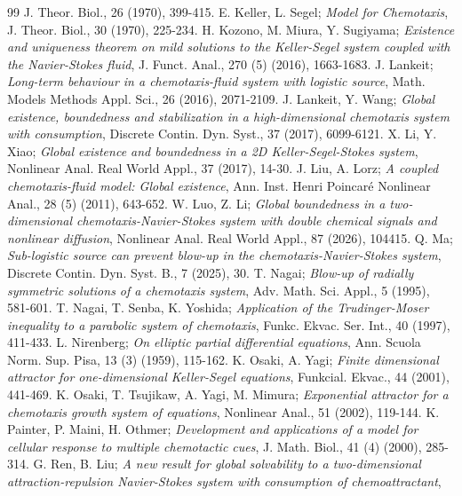\documentclass[10pt,a4paper]{amsart}
\numberwithin{equation}{section}
\begin{document}
\begin{thebibliography}{99}
J. Theor. Biol., 26 (1970), 399-415.
 E. Keller, L. Segel;
\emph{Model for Chemotaxis}, J. Theor. Biol., 30 (1970), 225-234.
 H. Kozono, M. Miura, Y. Sugiyama;
\emph{Existence and uniqueness theorem on mild solutions to the Keller-Segel 
system coupled with the Navier-Stokes fluid}, 
J. Funct. Anal., 270 (5) (2016), 1663-1683.
 J. Lankeit;
\emph{Long-term behaviour in a chemotaxis-fluid system with logistic source}, 
Math. Models Methods Appl. Sci., 26 (2016), 2071-2109.
 J. Lankeit, Y. Wang;
\emph{Global existence, boundedness and stabilization in a high-dimensional 
chemotaxis system with consumption}, Discrete Contin. Dyn. Syst., 37 (2017), 6099-6121.
 X. Li, Y. Xiao;
\emph{Global existence and boundedness in a 2D Keller-Segel-Stokes system}, 
Nonlinear Anal. Real World Appl., 37 (2017), 14-30.
 J. Liu, A. Lorz;
\emph{A coupled chemotaxis-fluid model: Global existence},
 Ann. Inst. Henri Poincar\'e Nonlinear Anal., 28 (5) (2011), 643-652.
 W. Luo, Z. Li;
\emph{Global boundedness in a two-dimensional chemotaxis-Navier-Stokes system with 
double chemical signals and nonlinear diffusion}, 
Nonlinear Anal. Real World Appl., 87 (2026), 104415.
 Q. Ma;
\emph{Sub-logistic source can prevent blow-up in the chemotaxis-Navier-Stokes system}, 
Discrete Contin. Dyn. Syst. B., 7 (2025), 30.
 T. Nagai;
\emph{Blow-up of radially symmetric solutions of a chemotaxis system}, 
Adv. Math. Sci. Appl., 5 (1995), 581-601.
 T. Nagai, T. Senba, K. Yoshida;
\emph{Application of the Trudinger-Moser inequality to a parabolic system of chemotaxis},
Funkc. Ekvac. Ser. Int., 40 (1997), 411-433.
 L. Nirenberg;
\emph{On elliptic partial differential equations},
 Ann. Scuola Norm. Sup. Pisa, 13 (3) (1959), 115-162.
 K. Osaki, A. Yagi;
\emph{Finite dimensional attractor for one-dimensional Keller-Segel equations}, 
Funkcial. Ekvac., 44 (2001), 441-469.
 K. Osaki, T. Tsujikaw, A. Yagi, M. Mimura;
\emph{Exponential attractor for a chemotaxis growth system of equations}, 
Nonlinear Anal., 51 (2002), 119-144.
 K. Painter, P. Maini, H. Othmer;
\emph{Development and applications of a model for cellular response to multiple
 chemotactic cues}, J. Math. Biol., 41 (4) (2000), 285-314.
 G. Ren, B. Liu;
\emph{A new result for global solvability to a two-dimensional attraction-repulsion
 Navier-Stokes system with consumption of chemoattractant}, 

\end{thebibliography}
\end{document}
